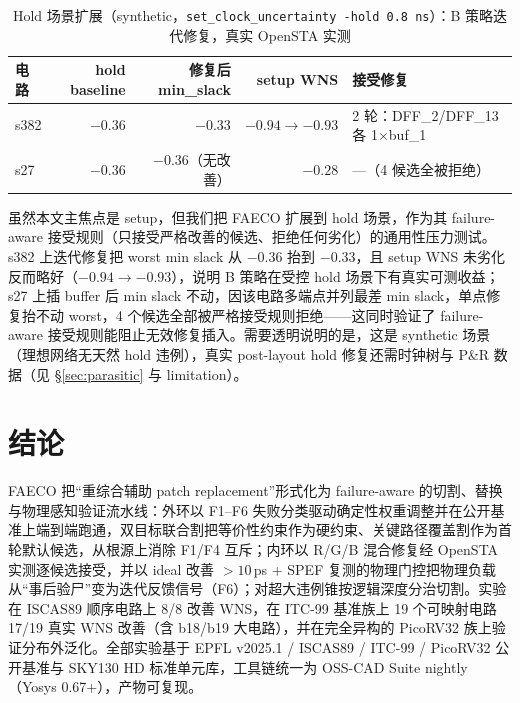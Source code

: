 \documentclass[journal]{IEEEtran}
\begin{document}
\begin{table}[!t]
\centering
\caption{Hold 场景扩展（synthetic，\texttt{set\_clock\_uncertainty -hold 0.8\,ns}）：B 策略迭代修复，真实 OpenSTA 实测}
\label{tab:hold}
\scriptsize
\setlength{\tabcolsep}{4pt}
\begin{tabular}{lrrrl}
\toprule
\textbf{电路} & \textbf{hold baseline} & \textbf{修复后 min\_slack} & \textbf{setup WNS} & \textbf{接受修复} \\
\midrule
s382 & $-0.36$ & $-0.33$ & $-0.94\rightarrow -0.93$ & 2 轮：DFF\_2/DFF\_13 各 1$\times$buf\_1 \\
s27 & $-0.36$ & $-0.36$（无改善） & $-0.28$ & ---（4 候选全被拒绝） \\
\bottomrule
\end{tabular}
\end{table}

虽然本文主焦点是 setup，但我们把 FAECO 扩展到 hold 场景，作为其 failure-aware 接受规则（只接受严格改善的候选、拒绝任何劣化）的通用性压力测试。s382 上迭代修复把 worst min slack 从 $-0.36$ 抬到 $-0.33$，且 setup WNS 未劣化反而略好（$-0.94\rightarrow-0.93$），说明 B 策略在受控 hold 场景下有真实可测收益；s27 上插 buffer 后 min slack 不动，因该电路多端点并列最差 min slack，单点修复抬不动 worst，4 个候选全部被严格接受规则拒绝——这同时验证了 failure-aware 接受规则能阻止无效修复插入。需要透明说明的是，这是 synthetic 场景（理想网络无天然 hold 违例），真实 post-layout hold 修复还需时钟树与 P\&R 数据（见 \S\ref{sec:parasitic} 与 limitation）。

\section{结论}\label{sec:conclusion}

FAECO 把“重综合辅助 patch replacement”形式化为 failure-aware 的切割、替换与物理感知验证流水线：外环以 F1--F6 失败分类驱动确定性权重调整并在公开基准上端到端跑通，双目标联合割把等价性约束作为硬约束、关键路径覆盖割作为首轮默认候选，从根源上消除 F1/F4 互斥；内环以 R/G/B 混合修复经 OpenSTA 实测逐候选接受，并以 ideal 改善 $>10$\,ps + SPEF 复测的物理门控把物理负载从“事后验尸”变为迭代反馈信号（F6）；对超大违例锥按逻辑深度分治切割。实验在 ISCAS89 顺序电路上 8/8 改善 WNS，在 ITC-99 基准族上 19 个可映射电路 17/19 真实 WNS 改善（含 b18/b19 大电路），并在完全异构的 PicoRV32 族上验证分布外泛化。全部实验基于 EPFL v2025.1 / ISCAS89 / ITC-99 / PicoRV32 公开基准与 SKY130 HD 标准单元库，工具链统一为 OSS-CAD Suite nightly（Yosys 0.67+），产物可复现。
\end{document}
